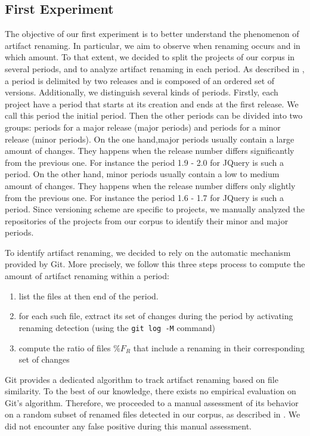 \subsection{First Experiment}

The objective of our first experiment is to better understand the phenomenon of artifact renaming. In particular, we aim to observe when renaming occurs and in which amount. To that extent, we decided to split the projects of our corpus in several periods, and to analyze artifact renaming in each period. As described in , a period is delimited by two releases and is composed of an ordered set of versions. Additionally, we distinguish several kinds of periods. Firstly, each project have a period that starts at its creation and ends at the first release. We call this period the initial period. Then the other periods can be divided into two groups: periods for a major release (major periods) and periods for a minor release (minor periods). On the one hand,major periods usually contain a large amount of changes. They happens when the release number differs significantly from the previous one. For instance the period 1.9 - 2.0 for JQuery is such a period. On the other hand, minor periods usually contain a low to medium amount of changes. They happens when the release number differs only slightly from the previous one. For instance the period 1.6 - 1.7 for JQuery is such a period. Since versioning scheme are specific to projects, we manually analyzed the repositories of the projects from our corpus to identify their minor and major periods.

To identify artifact renaming, we decided to rely on the automatic mechanism provided by Git. More precisely, we follow this three steps process to compute the amount of artifact renaming within a period:

\begin{enumerate}
	\item list the files at then end of the period.
	\item for each such file, extract its set of changes during the period by activating renaming detection (using the \texttt{git log -M} command)
	\item compute the ratio of files $\%F_{R}$ that include a renaming in their corresponding set of changes
\end{enumerate} 

Git provides a dedicated algorithm to track artifact renaming based on file similarity. To the best of our knowledge, there exists no empirical evaluation on Git's algorithm. Therefore, we proceeded to a manual assessment of its behavior on a random subset of renamed files detected in our corpus, as described in . We did not encounter any false positive during this manual assessment.

